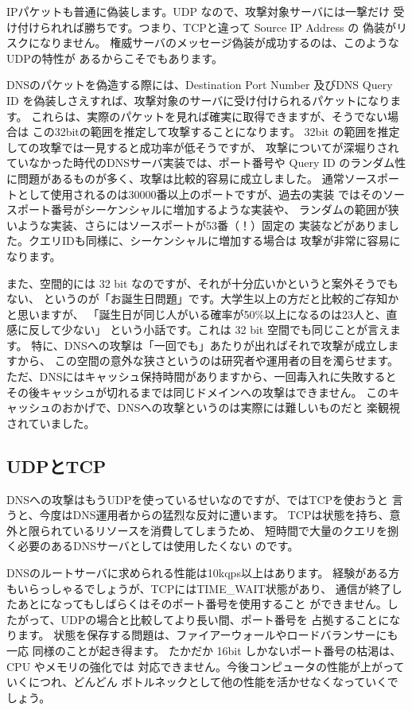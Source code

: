 IPパケットも普通に偽装します。UDP なので、攻撃対象サーバには一撃だけ
受け付けられれば勝ちです。つまり、TCPと違って Source IP Address の
偽装がリスクになりません。
権威サーバのメッセージ偽装が成功するのは、このようなUDPの特性が
あるからこそでもあります。

DNSのパケットを偽造する際には、Destination Port Number 及びDNS Query
ID を偽装しさえすれば、攻撃対象のサーバに受け付けられるパケットになります。
これらは、実際のパケットを見れば確実に取得できますが、そうでない場合は
この32bitの範囲を推定して攻撃することになります。
32bit の範囲を推定しての攻撃では一見すると成功率が低そうですが、
攻撃についてが深堀りされていなかった時代のDNSサーバ実装では、ポート番号や
Query ID のランダム性に問題があるものが多く、攻撃は比較的容易に成立しました。
通常ソースポートとして使用されるのは30000番以上のポートですが、過去の実装
ではそのソースポート番号がシーケンシャルに増加するような実装や、
ランダムの範囲が狭いような実装、さらにはソースポートが53番（！）固定の
実装などがありました。クエリIDも同様に、シーケンシャルに増加する場合は
攻撃が非常に容易になります。

また、空間的には 32 bit なのですが、それが十分広いかというと案外そうでもない、
というのが「お誕生日問題」です。大学生以上の方だと比較的ご存知かと思いますが、
「誕生日が同じ人がいる確率が50\%以上になるのは23人と、直感に反して少ない」
という小話です。これは 32 bit 空間でも同じことが言えます。
特に、DNSへの攻撃は「一回でも」あたりが出ればそれで攻撃が成立しますから、
この空間の意外な狭さというのは研究者や運用者の目を濁らせます。
ただ、DNSにはキャッシュ保持時間がありますから、一回毒入れに失敗すると
その後キャッシュが切れるまでは同じドメインへの攻撃はできません。
このキャッシュのおかげで、DNSへの攻撃というのは実際には難しいものだと
楽観視されていました。

\subsection{UDPとTCP}
DNSへの攻撃はもうUDPを使っているせいなのですが、ではTCPを使おうと
言うと、今度はDNS運用者からの猛烈な反対に遭います。
TCPは状態を持ち、意外と限られているリソースを消費してしまうため、
短時間で大量のクエリを捌く必要のあるDNSサーバとしては使用したくない
のです。

DNSのルートサーバに求められる性能は10kqps以上はあります。
経験がある方もいらっしゃるでしょうが、TCPにはTIME\_WAIT状態があり、
通信が終了したあとになってもしばらくはそのポート番号を使用すること
ができません。したがって、UDPの場合と比較してより長い間、ポート番号を
占拠することになります。
状態を保存する問題は、ファイアーウォールやロードバランサーにも一応
同様のことが起き得ます。
たかだか 16bit しかないポート番号の枯渇は、CPU やメモリの強化では
対応できません。今後コンピュータの性能が上がっていくにつれ、どんどん
ボトルネックとして他の性能を活かせなくなっていくでしょう。

